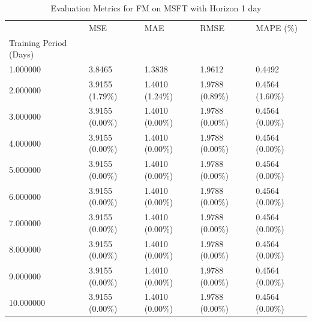 \begin{table}
\caption{Evaluation Metrics for FM on MSFT with Horizon 1 day}
\label{tab:fm_MSFT_h1_metrics}
\begin{tabular}{lllll}
\toprule
 & MSE & MAE & RMSE & MAPE (\%) \\
Training Period (Days) &  &  &  &  \\
\midrule
1.000000 & 3.8465 & 1.3838 & 1.9612 & 0.4492 \\
2.000000 & 3.9155 (1.79\%) & 1.4010 (1.24\%) & 1.9788 (0.89\%) & 0.4564 (1.60\%) \\
3.000000 & 3.9155 (0.00\%) & 1.4010 (0.00\%) & 1.9788 (0.00\%) & 0.4564 (0.00\%) \\
4.000000 & 3.9155 (0.00\%) & 1.4010 (0.00\%) & 1.9788 (0.00\%) & 0.4564 (0.00\%) \\
5.000000 & 3.9155 (0.00\%) & 1.4010 (0.00\%) & 1.9788 (0.00\%) & 0.4564 (0.00\%) \\
6.000000 & 3.9155 (0.00\%) & 1.4010 (0.00\%) & 1.9788 (0.00\%) & 0.4564 (0.00\%) \\
7.000000 & 3.9155 (0.00\%) & 1.4010 (0.00\%) & 1.9788 (0.00\%) & 0.4564 (0.00\%) \\
8.000000 & 3.9155 (0.00\%) & 1.4010 (0.00\%) & 1.9788 (0.00\%) & 0.4564 (0.00\%) \\
9.000000 & 3.9155 (0.00\%) & 1.4010 (0.00\%) & 1.9788 (0.00\%) & 0.4564 (0.00\%) \\
10.000000 & 3.9155 (0.00\%) & 1.4010 (0.00\%) & 1.9788 (0.00\%) & 0.4564 (0.00\%) \\
\bottomrule
\end{tabular}
\end{table}
